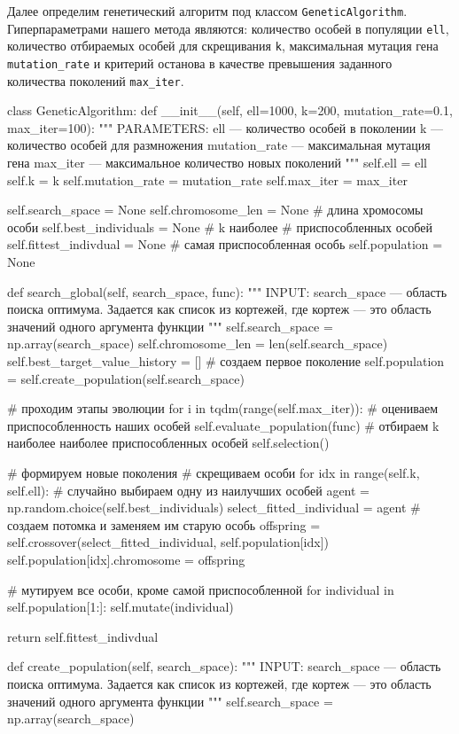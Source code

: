 Далее определим генетический алгоритм под классом \texttt{GeneticAlgorithm}. Гиперпараметрами нашего метода являются: количество особей в популяции \texttt{ell}, количество отбираемых особей для скрещивания \texttt{k}, максимальная мутация гена \texttt{mutation\_rate} и критерий останова в качестве превышения заданного количества поколений \texttt{max\_iter}.
\begin{pyin}
class GeneticAlgorithm:
  def __init__(self, ell=1000, k=200, mutation_rate=0.1,
	             max_iter=100):
    """
    PARAMETERS:
    ell --- количество особей в поколении
    k --- количество особей для размножения
    mutation_rate --- максимальная мутация гена
    max_iter --- максимальное количество новых поколений
    """
    self.ell = ell
    self.k = k
    self.mutation_rate = mutation_rate
    self.max_iter = max_iter

    self.search_space = None
    self.chromosome_len = None # длина хромосомы особи
    self.best_individuals = None # k наиболее
    # приспособленных особей
    self.fittest_indivdual = None # самая приспособленная особь
    self.population = None
\end{pyin}

\begin{pyprint}
  def search_global(self, search_space, func):
    """
    INPUT:
    search_space --- область поиска оптимума. Задается как список
    из кортежей, где кортеж --- это область значений одного
    аргумента функции
    """
    self.search_space = np.array(search_space)
    self.chromosome_len = len(self.search_space)
    self.best_target_value_history = []
    # создаем первое поколение
    self.population = self.create_population(self.search_space)

    # проходим этапы эволюции
    for i in tqdm(range(self.max_iter)):
       # оцениваем приспособленность наших особей
       self.evaluate_population(func)
       # отбираем k наиболее наиболее приспособленных особей
       self.selection()

       # формируем новые поколения
       # скрещиваем особи
       for idx in range(self.k, self.ell):
          # случайно выбираем одну из наилучших особей
          agent = np.random.choice(self.best_individuals)
          select_fitted_individual = agent
          # создаем потомка и заменяем им старую особь
          offspring = self.crossover(select_fitted_individual,
                                     self.population[idx])
          self.population[idx].chromosome = offspring

       # мутируем все особи, кроме самой приспособленной
       for individual in self.population[1:]:
          self.mutate(individual)

    return self.fittest_indivdual

  def create_population(self, search_space):
    """
    INPUT:
    search_space --- область поиска оптимума. Задается как список
    из кортежей, где кортеж --- это область значений одного
    аргумента функции
    """
    self.search_space = np.array(search_space)
\end{pyprint}

